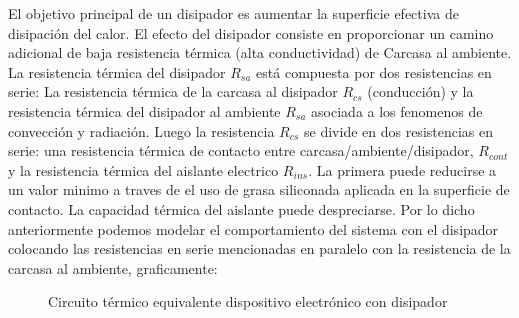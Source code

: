 El objetivo principal de un disipador es aumentar la superficie efectiva de disipación del calor. El efecto del disipador
consiste en proporcionar un camino adicional de baja resistencia térmica (alta conductividad) de Carcasa al ambiente. La resistencia térmica del disipador $R_{sa}$ está
compuesta por dos resistencias en serie: La resistencia térmica de la carcasa al disipador $R_{cs}$ (conducción) y la resistencia térmica del disipador al ambiente $R_{sa}$
asociada a los fenomenos de convección y radiación. Luego la resistencia $R_{cs}$ se divide en dos resistencias en serie: una resistencia térmica de contacto entre
carcasa/ambiente/disipador, $R_{cont}$ y la resistencia térmica del aislante electrico $R_{ins}$. La primera puede reducirse a un valor minimo a traves de el uso de
grasa siliconada aplicada en la superficie de contacto. La capacidad térmica del aislante puede despreciarse. Por lo dicho anteriormente podemos modelar el comportamiento del sistema
con el disipador colocando las resistencias en serie mencionadas en paralelo con la resistencia de la carcasa al ambiente, graficamente:
\begin{figure}[H]
\centering
{}
\caption{Circuito térmico equivalente dispositivo electrónico con disipador}\label{fig:circuito_disipador}
\end{figure}
